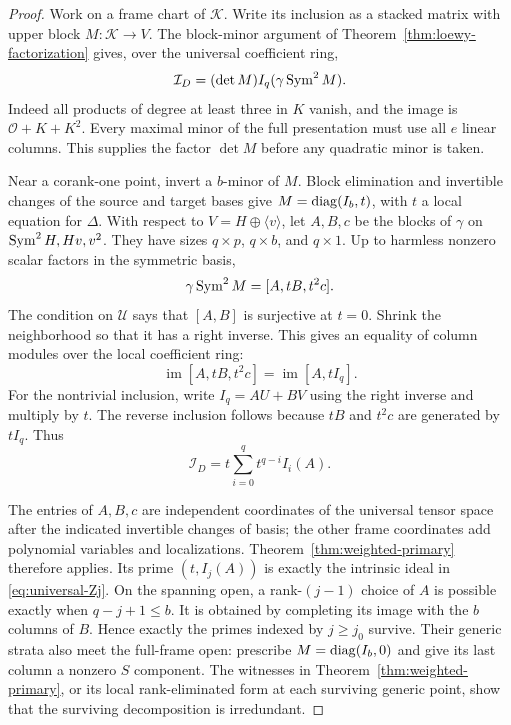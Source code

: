\begin{proof}
Work on a frame chart of $\mathscr K$. Write its inclusion as a
stacked matrix with upper block $M:\mathscr K\to V$.
The block-minor argument of Theorem~\ref{thm:loewy-factorization}
gives, over the universal coefficient ring,
\[
 \mathcal I_D=(\det M)I_q(\gamma\operatorname{Sym}^2M).
\]
Indeed all products of degree at least three in $K$ vanish, and
the image is $\mathcal O+K+K^2$. Every maximal minor of the full
presentation must use all $e$ linear columns. This supplies the
factor $\det M$ before any quadratic minor is taken.

Near a corank-one point, invert a $b$-minor of $M$. Block elimination
and invertible changes of the source and target bases give
$M=\operatorname{diag}(I_b,t)$, with $t$ a local equation for $\Delta$.
With respect to $V=H\oplus\langle v\rangle$, let $A,B,c$
be the blocks of $\gamma$ on $\operatorname{Sym}^2H,Hv,v^2$. They have sizes
$q\times p$, $q\times b$, and $q\times1$. Up to harmless nonzero
scalar factors in the symmetric basis,
\[
 \gamma\operatorname{Sym}^2M=[A,tB,t^2c].
\]
The condition on $\mathscr U$ says that $[A,B]$ is surjective
at $t=0$. Shrink the neighborhood so that it has a right inverse.
This gives an equality of column modules over the local coefficient
ring:
\begin{equation}\label{eq:quadratic-module-reduction}
 \operatorname{im}[A,tB,t^2c]
        =\operatorname{im}[A,tI_q].
\end{equation}
For the nontrivial inclusion, write $I_q=AU+BV$ using the right
inverse and multiply by $t$. The reverse inclusion follows because
$tB$ and $t^2c$ are generated by $tI_q$. Thus
\begin{equation}\label{eq:quadratic-weighted-normal}
 \mathcal I_D=t\sum_{i=0}^q t^{q-i}I_i(A).
\end{equation}

The entries of $A,B,c$ are independent coordinates of the universal
tensor space after the indicated invertible changes of basis; the
other frame coordinates add polynomial variables and localizations.
Theorem~\ref{thm:weighted-primary} therefore applies. Its prime
$(t,I_j(A))$ is exactly the intrinsic ideal in
\eqref{eq:universal-Zj}. On the spanning open, a rank-$(j-1)$
choice of $A$ is possible exactly when $q-j+1\le b$.
It is obtained by completing its image with the $b$ columns of $B$.
Hence exactly the primes indexed by $j\ge j_0$ survive.
Their generic strata also meet the full-frame open: prescribe
$M=\operatorname{diag}(I_b,0)$ and give its last column a nonzero $S$ component.
The witnesses in Theorem~\ref{thm:weighted-primary}, or its
local rank-eliminated form at each surviving generic point, show
that the surviving decomposition is irredundant.


\end{proof}
